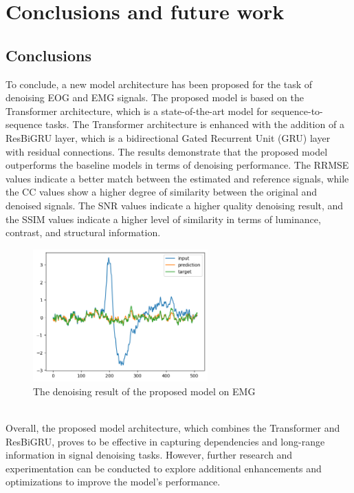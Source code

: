 \documentclass[a4paper, noexaminfo]{sapthesis}
\begin{document}
\chapter{Conclusions and future work}
\section{Conclusions}
To conclude, a new model architecture has been proposed for the task of
denoising EOG and EMG signals. The proposed model is based on the
Transformer architecture, which is a state-of-the-art model for
sequence-to-sequence tasks. The Transformer architecture is enhanced
with the addition of a ResBiGRU layer, which is a bidirectional
Gated Recurrent Unit (GRU) layer with residual connections. 
The results demonstrate that the proposed model outperforms the baseline 
models in terms of denoising performance. The RRMSE values indicate a 
better match between the estimated and reference signals, while the CC 
values show a higher degree of similarity between the original and 
denoised signals. The SNR values indicate a higher quality denoising 
result, and the SSIM values indicate a higher level of similarity in 
terms of luminance, contrast, and structural information.
\begin{figure}[h!]
\centering
\includegraphics[width=0.6\textwidth]{images/example_denoised.png}
\caption{The denoising result of the proposed model on EMG}
\end{figure}
\newline \\
Overall, the proposed model architecture, which combines the Transformer 
and ResBiGRU, proves to be effective in capturing dependencies and 
long-range information in signal denoising tasks. However, further 
research and experimentation can be conducted to explore additional 
enhancements and optimizations to improve the model's performance.
\end{document}
